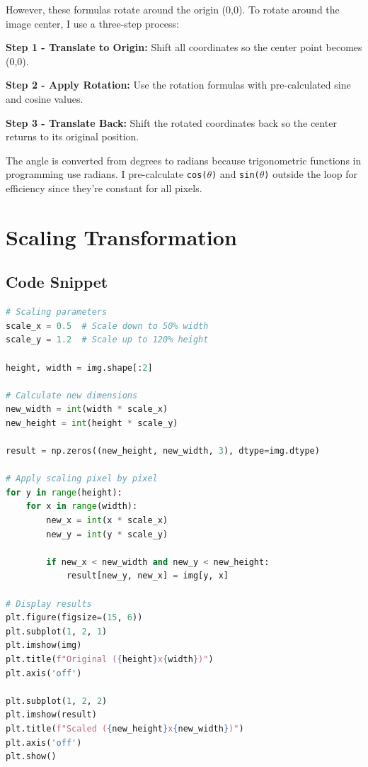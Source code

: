 \documentclass[12pt,a4paper]{report}
\begin{document}
However, these formulas rotate around the origin (0,0). To rotate around the image center, I use a three-step process:

\textbf{Step 1 - Translate to Origin:} Shift all coordinates so the center point becomes (0,0).

\textbf{Step 2 - Apply Rotation:} Use the rotation formulas with pre-calculated sine and cosine values.

\textbf{Step 3 - Translate Back:} Shift the rotated coordinates back so the center returns to its original position.

The angle is converted from degrees to radians because trigonometric functions in programming use radians. I pre-calculate \texttt{cos($\theta$)} and \texttt{sin($\theta$)} outside the loop for efficiency since they're constant for all pixels.

\section{Scaling Transformation}

\subsection{Code Snippet}
\begin{lstlisting}[language=Python, caption={Manual Scaling Implementation}]
# Scaling parameters
scale_x = 0.5  # Scale down to 50% width
scale_y = 1.2  # Scale up to 120% height

height, width = img.shape[:2]

# Calculate new dimensions
new_width = int(width * scale_x)
new_height = int(height * scale_y)

result = np.zeros((new_height, new_width, 3), dtype=img.dtype)

# Apply scaling pixel by pixel
for y in range(height):
    for x in range(width):
        new_x = int(x * scale_x)
        new_y = int(y * scale_y)
        
        if new_x < new_width and new_y < new_height:
            result[new_y, new_x] = img[y, x]

# Display results
plt.figure(figsize=(15, 6))
plt.subplot(1, 2, 1)
plt.imshow(img)
plt.title(f"Original ({height}x{width})")
plt.axis('off')

plt.subplot(1, 2, 2)
plt.imshow(result)
plt.title(f"Scaled ({new_height}x{new_width})")
plt.axis('off')
plt.show()
\end{lstlisting}
\end{document}
